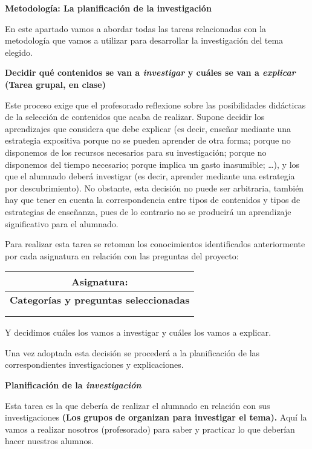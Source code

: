 \documentclass[
]{article}
\author{}
\date{}
\begin{document}
\textbf{Metodología: La planificación de la investigación}

En este apartado vamos a abordar todas las tareas relacionadas con la
metodología que vamos a utilizar para desarrollar la investigación del
tema elegido.

\textbf{Decidir qué contenidos se van a \emph{investigar} y cuáles se
van a \emph{explicar} (Tarea grupal, en clase)}

Este proceso exige que el profesorado reflexione sobre las posibilidades
didácticas de la selección de contenidos que acaba de realizar. Supone
decidir los aprendizajes que considera que debe explicar (es decir,
enseñar mediante una estrategia expositiva porque no se pueden aprender
de otra forma; porque no disponemos de los recursos necesarios para su
investigación; porque no disponemos del tiempo necesario; porque implica
un gasto inasumible; \ldots), y los que el alumnado deberá investigar
(es decir, aprender mediante una estrategia por descubrimiento). No
obstante, esta decisión no puede ser arbitraria, también hay que tener
en cuenta la correspondencia entre tipos de contenidos y tipos de
estrategias de enseñanza, pues de lo contrario no se producirá un
aprendizaje significativo para el alumnado.

Para realizar esta tarea se retoman los conocimientos identificados
anteriormente por cada asignatura en relación con las preguntas del
proyecto:

\begin{longtable}[]{@{}c@{}}
\toprule
\textbf{Asignatura:} \\
\midrule
\endhead
\textbf{Categorías y preguntas seleccionadas} \\
 \\
 \\
\bottomrule
\end{longtable}

Y decidimos cuáles los vamos a investigar y cuáles los vamos a explicar.

Una vez adoptada esta decisión se procederá a la planificación de las
correspondientes investigaciones y explicaciones.

\textbf{Planificación de la \emph{investigación}}

Esta tarea es la que debería de realizar el alumnado en relación con sus
investigaciones \textbf{(Los grupos} \textbf{de organizan para
investigar el tema).} Aquí la vamos a realizar nosotros (profesorado)
para saber y practicar lo que deberían hacer nuestros alumnos.
\end{document}

